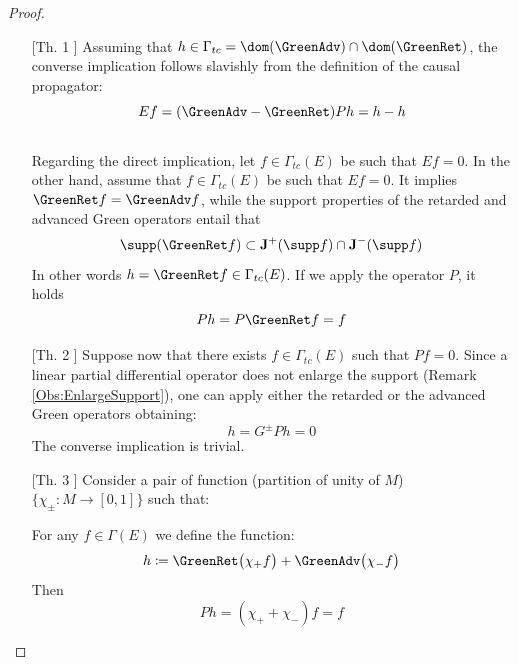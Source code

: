\documentclass[Main]{subfiles}
\begin{document}
			\begin{proof}
			\forcenewline
				\begin{itemize}
				\item[[Th. 1]]
					Assuming that $h\in \Gamma_{tc} = \dom(\GreenAdv) \cap \dom(\GreenRet)$, the converse implication follows slavishly from the definition of the causal propagator:
					\begin{displaymath}
						E f= (\GreenAdv - \GreenRet) P h = h -h
					\end{displaymath}
					\\
					\ifToninus Regarding the direct implication, let $f \in \Gamma_{tc}(E)$ be such that $E f = 0$.
					\else In the other hand, assume that $f \in \Gamma_{tc}(E)$ be such that $E f = 0$.
					\fi
					It implies $\GreenRet f = \GreenAdv f $, while the support properties of the retarded and advanced Green operators entail that
					\begin{displaymath}
						\supp (\GreenRet f ) \subset \mathbf{J}^+ (\supp f) \cap \mathbf{J}^- (\supp f)
					\end{displaymath}
					 In other words $h = \GreenRet f \in \Gamma_{tc}(E)$. 
					 If we apply the operator $P$, it holds 
					 \begin{displaymath}
					 	P h = P \GreenRet f = f
					 \end{displaymath}

				\item[[Th. 2]]
					Suppose now that there exists $f \in \Gamma_{tc}(E)$ such that $Pf = 0$. Since a linear partial differential operator does not enlarge the support (Remark \ref{Obs:EnlargeSupport}), one can apply either
the retarded or the advanced Green operators obtaining:
					\begin{displaymath}
						h = G^\pm P h = 0
					\end{displaymath}
					The converse implication is trivial.

				\item[	[Th. 3]]			
					Consider a pair of function (partition of unity of $M$) $\{\chi_\pm: M \rightarrow [0,1] \}$ such that:
					For any $f \in 	\Gamma(E)$ we define the function:
					\begin{displaymath}
						h \coloneqq \GreenRet \big( \chi_+ f \big) + \GreenAdv \big( \chi_- f \big)
					\end{displaymath}
					Then
					\begin{displaymath}
						P h = (\chi_+ + \chi_-)f = f
					\end{displaymath}
				\end{itemize}
			\end{proof}
			
\end{document}

